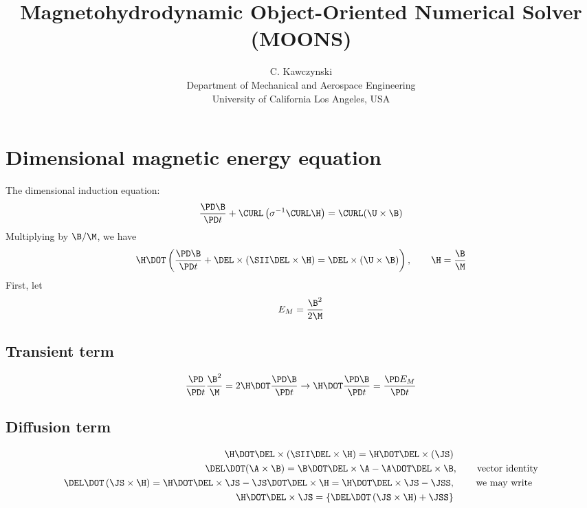 \documentclass[11pt]{article}
\begin{document}
\doublespacing
\title{Magnetohydrodynamic Object-Oriented Numerical Solver (MOONS)}
\author{C. Kawczynski \\
Department of Mechanical and Aerospace Engineering \\
University of California Los Angeles, USA\\
}
\maketitle

\section{Dimensional magnetic energy equation}
The dimensional induction equation:
\begin{equation}
	\frac{\PD \B}{\PD t} + \CURL \left( \sigma^{-1}\CURL \H \right)
	= \CURL (\U \times \B)
\end{equation}
Multiplying by $\B / \M$, we have
\begin{equation}
	\H \DOT
	\left(
	\frac{\PD \B}{\PD t} +
	\DEL \times (\SII \DEL \times \H) =
	\DEL \times (\U \times \B)
	\right), \qquad \H = \frac{\B}{\M}
\end{equation}
First, let
\begin{equation}
	E_M = \frac{\B^2}{2\M}
\end{equation}

\subsection{Transient term}
\begin{equation}
	\frac{\PD}{\PD t} \frac{\B^2}{\M} = 2 \H \DOT \frac{\PD \B}{\PD t}
	\rightarrow
	\H \DOT \frac{\PD \B}{\PD t} =
	\frac{\PD E_M}{\PD t}
\end{equation}
\subsection{Diffusion term}
\begin{equation}\begin{aligned}
	\H \DOT \DEL \times \left( \SII \DEL \times \H \right) = \H \DOT \DEL \times \left( \JS \right) & \\
	\DEL \DOT (\A \times \B) = \B \DOT \DEL \times \A - \A \DOT \DEL \times \B &, \qquad \text{vector identity} \\
	\DEL \DOT \left(\JS \times \H \right) =
	\H \DOT \DEL \times \JS - \JS \DOT \DEL \times \H =
	\H \DOT \DEL \times \JS - \JSS, & \qquad \text{ we may write} \\
	\H \DOT \DEL \times \JS =
	\left\{ \DEL \DOT \left(\JS \times \H \right) + \JSS \right\}
\end{aligned}\end{equation}
\end{document}
